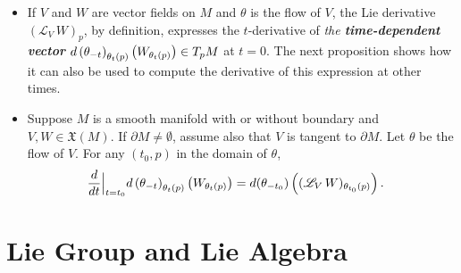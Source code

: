 \documentclass[11pt]{article}
\begin{document}
\begin{itemize}
\item \begin{remark}
If $V$ and $W$ are vector fields on $M$ and $\theta$ is the flow of $V$, the Lie derivative $(\mathscr{L}_{V}\,W)_{p}$, by definition, expresses the $t$-derivative of \emph{the \textbf{time-dependent vector}} $d\left(\theta_{-t}\right)_{\theta_{t}(p)}\left(W_{\theta_t(p)}\right)  \in T_{p}M$ at $t = 0$. The next proposition shows how it can also
be used to compute the derivative of this expression at other times. 
\end{remark}

\item \begin{proposition}
Suppose $M$ is a smooth manifold with or without boundary and $V, W \in \mathfrak{X}(M)$. If $\partial M \neq \emptyset$, assume also that $V$ is tangent to $\partial M$. Let $\theta$ be the flow of $V$. For any $(t_0, p)$ in the domain of $\theta$,
\begin{align}
 \frac{d}{dt}\Bigr|_{t=t_0} d\left(\theta_{-t}\right)_{\theta_{t}(p)}\left(W_{\theta_t(p)}\right)&= d(\theta_{-t_0})\left((\mathscr{L}_{V}\,W)_{\theta_{t_0}(p)}\right).  \label{eqn: lie_derivative_at_other_time}
\end{align}
\end{proposition}

\end{itemize}


\section{Lie Group and Lie Algebra}


\newpage


\end{document}
